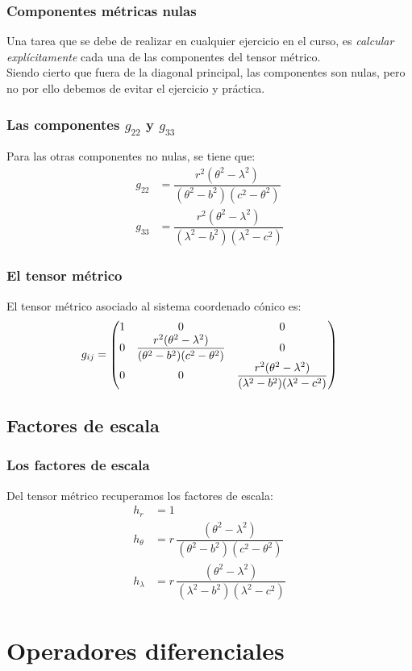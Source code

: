 \documentclass[12pt]{beamer}
\begin{document}
\begin{frame}
\frametitle{Componentes métricas nulas}
Una tarea que se debe de realizar en cualquier ejercicio en el curso, es \emph{calcular explícitamente} cada una de las componentes del tensor métrico.
\\
\bigskip
\pause
Siendo cierto que fuera de la diagonal principal, las componentes son nulas, pero no por ello debemos de evitar el ejercicio y práctica.
\end{frame}
\begin{frame}
\frametitle{Las componentes $g_{22}$ y $g_{33}$}
Para las otras componentes no nulas, se tiene que:
\pause
\begin{align*}
g_{22} &= \dfrac{r^{2} (\theta^{2} - \lambda^{2})}{(\theta^{2} - b^{2})(c^{2} - \theta^{2})} \\[0.5em]
g_{33} &= \dfrac{r^{2} (\theta^{2} - \lambda^{2})}{(\lambda^{2} - b^{2})(\lambda^{2} - c^{2})}
\end{align*}
\end{frame}
\begin{frame}
\frametitle{El tensor métrico}
El tensor métrico asociado al sistema coordenado cónico es:
\pause
\begin{align*}
g_{ij} = \mqty(
1 & 0 & 0 \\
0 & \dfrac{r^{2} (\theta^{2} - \lambda^{2})}{(\theta^{2} - b^{2})(c^{2} - \theta^{2})} & 0 \\
0 & 0 & \dfrac{r^{2} (\theta^{2} - \lambda^{2})}{(\lambda^{2} - b^{2})(\lambda^{2} - c^{2})}
)
\end{align*}
\end{frame}

\subsection{Factores de escala}

\begin{frame}
\frametitle{Los factores de escala}
Del tensor métrico recuperamos los factores de escala:
\pause
\begin{align*}
h_{r} &= 1 \\[0.5em]
h_{\theta} &=  r \, \dfrac{(\theta^{2} - \lambda^{2})}{(\theta^{2} - b^{2})(c^{2} - \theta^{2})} \\[0.5em]
h_{\lambda} &= r \, \dfrac{(\theta^{2} - \lambda^{2})}{(\lambda^{2} - b^{2})(\lambda^{2} - c^{2})}
\end{align*}
\end{frame}

\section{Operadores diferenciales}
\end{document}
